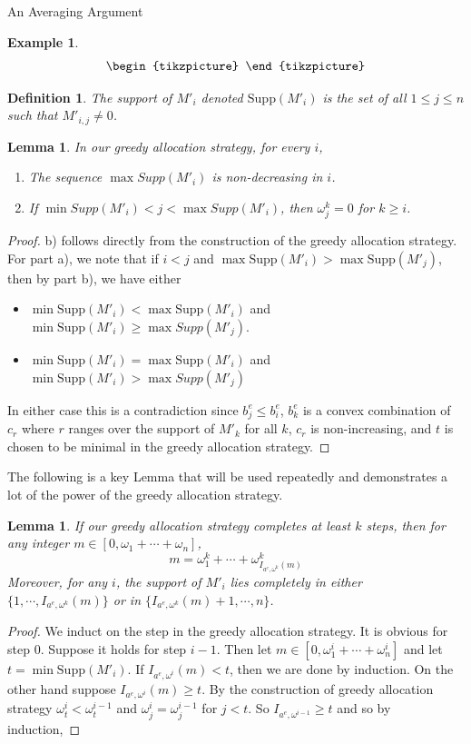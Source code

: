 \documentclass[11pt,a4paper]{article}
\newcounter{foo}
\newtheorem{lemma}[subsection]{Lemma}
\newtheorem{definition}[foo]{Definition}
\newtheorem{example}{Example}
\newcommand{\Supp}{\mathrm{Supp}}
\begin{document}
\begin{section}{An Averaging Argument}
\begin{example}
\[\begin{tikzpicture}
\end{tikzpicture}
\]


\end{example}

\begin{definition} The support of $M'_i$ denoted $\Supp(M'_i)$ is the set of all $1 \leq j \leq n$ such that $M'_{i, j} \neq 0$.
\end{definition}
\begin{lemma} {\label{support} } In our greedy allocation strategy, for every $i$,
\begin{enumerate}
\item The sequence $ \max Supp(M'_i)$ is non-decreasing in $i$.
\item If $ \min Supp(M'_i) < j < \max Supp(M'_i)$, then $\omega^k_{j} = 0$ for $k \geq i$.
\end{enumerate}
\end{lemma}
\begin{proof} b) follows directly from the construction of the greedy allocation strategy. For part a), we note that if $i < j$ and $\max \Supp(M'_i) > \max \Supp(M'_j)$, then by part b), we have either
\begin{itemize}
\item $\min \Supp(M'_i) < \max \Supp(M'_i)$ and $\min \Supp(M'_i) \geq \max Supp(M'_j)$.
\item $\min \Supp(M'_i) = \max \Supp(M'_i)$ and $\min \Supp (M'_i) > \max Supp(M'_j)$
\end{itemize} In either case this is a contradiction since $b^{e}_j \leq b^e_i$, $b^e_k$ is a convex combination of $c_r$ where $r$ ranges over the support of $M'_k$ for all $k$, $c_r$ is non-increasing, and $t$ is chosen to be minimal in the greedy allocation strategy.
\end{proof}
The following is a key Lemma that will be used repeatedly and demonstrates a lot of the power of the greedy allocation strategy.
\begin{lemma}\label{lemma_glue}
If our greedy allocation strategy completes at least $k$ steps, then for any integer $m \in [0, \omega_1 + \cdots + \omega_n]$,
\[
m = \omega^k_1 + \cdots + \omega^k_{I_{a^e, \omega^k} (m)}
\]
Moreover, for any $i$, the support of $M'_i$ lies completely in either $\{1, \cdots, I_{a^e, \omega^k} (m) \}$ or in $\{ I_{a^e, \omega^k} (m) + 1, \cdots , n \}$.
\end{lemma}
\begin{proof} We induct on the step in the greedy allocation strategy. It is obvious for step $0$. Suppose it holds for step $i - 1$. Then let $m \in [0, \omega^i_1 + \cdots + \omega^i_n]$ and let $t = \min \Supp(M'_i)$. If $I_{a^e, \omega^i} (m) <  t$, then we are done by induction. On the other hand suppose $I_{a^e, \omega^i} (m) \geq t$. By the construction of greedy allocation strategy $\omega^i_t < \omega^{i - 1}_t$  and $\omega^i_j = \omega^{i - 1}_j$ for $j < t$. So $I_{a^e, \omega^{i - 1}} \geq t$ and so by induction,

\end{proof}
\end{section}
\end{document}
